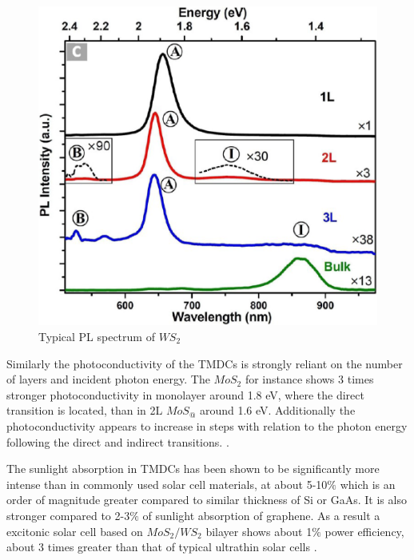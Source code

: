 \begin{figure}[h]
	\begin{center}
		\includegraphics[scale=0.3]{WS2TypicalPLSpectra.png}
		\caption{Typical PL spectrum of $WS_2$}
		\label{fig:WS2TypicalPLSpectra}
	\end{center}
\end{figure}
		
	Similarly the photoconductivity of the TMDCs is strongly reliant on the number of layers and incident photon energy. The $MoS_2$ for instance shows 3 times stronger photoconductivity in monolayer around 1.8 eV, where the direct transition is located, than in 2L $MoS_@$ around 1.6 eV. Additionally the photoconductivity appears to increase in steps with relation to the photon energy following the direct and indirect transitions. \cite{ElectronicsAndOptoelectronicsOfTwo-dimensionalTransitionMetalDichalcogenides}.
		
	The sunlight absorption in TMDCs has been shown to be significantly more intense than in commonly used solar cell materials, at about 5-10$\%$ which is an order of magnitude greater compared to similar thickness of Si or GaAs. It is also stronger compared to 2-3$\%$ of sunlight absorption of graphene. As a result a excitonic solar cell based on $MoS_2/WS_2$ bilayer shows about 1$\%$ power efficiency, about 3 times greater than that of typical ultrathin solar cells \cite{ExtraordinarySunlightAbsorptionAndOneNanometerThickPhotovoltaicsUsingTwo-DimensionalMonolayerMaterials}.
	
